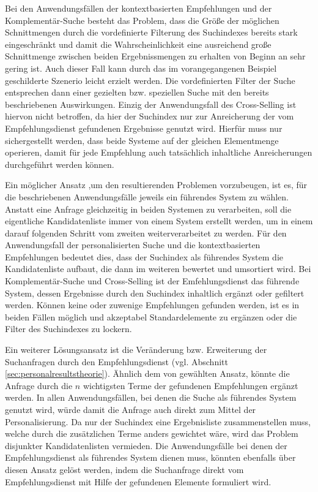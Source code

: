 Bei den Anwendungsfällen der kontextbasierten Empfehlungen und der Komplementär-Suche besteht das Problem, dass die Größe der möglichen Schnittmengen durch die vordefinierte Filterung des Suchindexes bereits stark eingeschränkt und damit die Wahrscheinlichkeit eine ausreichend große Schnittmenge zwischen beiden Ergebnissmengen zu erhalten von Beginn an sehr gering ist. Auch dieser Fall kann durch das im vorangegangenen Beispiel geschilderte Szenerio leicht erzielt werden. Die vordefinierten Filter der Suche entsprechen dann einer gezielten bzw. speziellen Suche mit den bereits beschriebenen Auswirkungen. Einzig der Anwendungsfall des Cross-Selling ist hiervon nicht betroffen, da hier der Suchindex nur zur Anreicherung der vom Empfehlungsdienst gefundenen Ergebnisse genutzt wird. Hierfür muss nur sichergestellt werden, dass beide Systeme auf der gleichen Elementmenge operieren, damit für jede Empfehlung auch tatsächlich inhaltliche Anreicherungen durchgeführt werden können.


Ein möglicher Ansatz ,um den resultierenden Problemen vorzubeugen, ist es, für die beschriebenen Anwendungsfälle jeweils ein führendes System zu wählen. Anstatt eine Anfrage gleichzeitig in beiden Systemen zu verarbeiten, soll die eigentliche Kandidatenliste immer von einem System erstellt werden, um in einem darauf folgenden Schritt vom zweiten weiterverarbeitet zu werden. Für den Anwendungsfall der personalisierten Suche und die kontextbasierten Empfehlungen bedeutet dies, dass der Suchindex als führendes System die Kandidatenliste aufbaut, die dann im weiteren bewertet und umsortiert wird. Bei Komplementär-Suche und Cross-Selling ist der Emfehlungsdienst das führende System, dessen Ergebnisse durch den Suchindex inhaltlich ergänzt oder gefiltert werden. Können keine oder zuwenige Empfehlungen gefunden werden, ist es in beiden Fällen möglich und akzeptabel Standardelemente zu ergänzen oder die Filter des Suchindexes zu lockern.

Ein weiterer Lösungsansatz ist die Veränderung bzw. Erweiterung der Suchanfragen durch den Empfehlungsdienst (vgl. Abschnitt \ref{sec:personalresultstheorie}). Ähnlich dem von \citep{Boughareb11} gewählten Ansatz, könnte die Anfrage durch die  $n$ wichtigsten Terme der gefundenen Empfehlungen ergänzt werden. In allen Anwendungsfällen, bei denen die Suche als führendes System genutzt wird, würde damit die Anfrage auch direkt zum Mittel der Personalisierung. Da nur der Suchindex eine Ergebnisliste zusammenstellen muss, welche durch die zusätzlichen Terme anders gewichtet wäre, wird das Problem disjunkter Kandidatenlisten vermieden. Die Anwendungsfälle bei denen der Empfehlungsdienst als führendes System dienen muss, könnten ebenfalls über diesen Ansatz gelöst werden, indem die Suchanfrage direkt vom Empfehlungsdienst mit Hilfe der gefundenen Elemente formuliert wird. %

